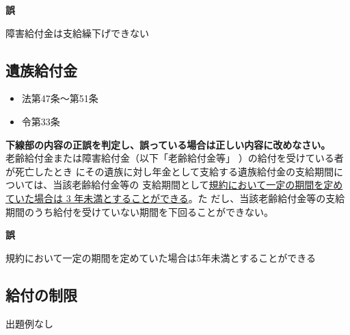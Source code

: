 \begin{answerbox}
  \textbf{誤}

  障害給付金は支給繰下げできない
\end{answerbox}

\newpage

\subsection{遺族給付金}



\begin{InyouJobunbox}
  \begin{itemize}
    \item 法第47条〜第51条
    \item 令第33条
  \end{itemize}
\end{InyouJobunbox}

\begin{truefalse}[年金1 2020 問題1(3)\textcircled{4}]
          \textbf{下線部の内容の正誤を判定し、誤っている場合は正しい内容に改めなさい。}
  \\

  老齢給付金または障害給付金（以下「老齢給付金等」 ）の給付を受けている者が死亡したとき
にその遺族に対し年金として支給する遺族給付金の支給期間については、当該老齢給付金等の
支給期間として\underline{規約において一定の期間を定めていた場合は 3 年未満とすることができる}。た
だし、当該老齢給付金等の支給期間のうち給付を受けていない期間を下回ることができない。
\end{truefalse}

\begin{answerbox}
  \textbf{誤}

  規約において一定の期間を定めていた場合は5年未満とすることができる
\end{answerbox}

\newpage

\subsection{給付の制限}

出題例なし

\newpage